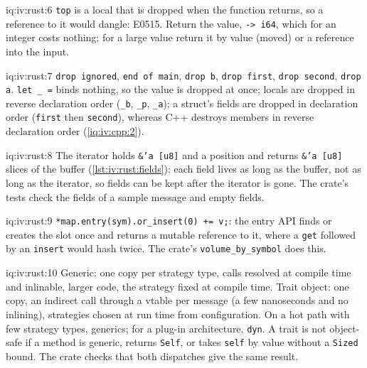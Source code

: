 \begin{solution}{iq:iv:rust:6}
\texttt{top} is a local that is dropped when the function returns, so a reference to it would dangle: E0515. Return the value,
\texttt{-> i64}, which for an integer costs nothing; for a large value return it by value (moved) or a reference into the input.
\end{solution}

\begin{solution}{iq:iv:rust:7}
\texttt{drop ignored}, \texttt{end of main}, \texttt{drop b}, \texttt{drop first}, \texttt{drop second}, \texttt{drop a}. \texttt{let \_ =}
binds nothing, so the value is dropped at once; locals are dropped in reverse declaration order (\texttt{\_b}, \texttt{\_p},
\texttt{\_a}); a struct's fields are dropped in declaration order (\texttt{first} then \texttt{second}), whereas C++ destroys members in
reverse declaration order (\cref{iq:iv:cpp:2}).
\end{solution}

\begin{solution}{iq:iv:rust:8}
The iterator holds \texttt{\&'a [u8]} and a position and returns \texttt{\&'a [u8]} slices of the buffer
(\cref{lst:iv:rust:fields}): each field lives as long as the buffer, not as long as the iterator, so fields can be kept after
the iterator is gone. The crate's tests check the fields of a sample message and empty fields.
\end{solution}

\begin{solution}{iq:iv:rust:9}
\texttt{*map.entry(sym).or\_insert(0) += v;}: the entry API finds or creates the slot once and returns a mutable reference to it, where a
\texttt{get} followed by an \texttt{insert} would hash twice. The crate's \texttt{volume\_by\_symbol} does this.
\end{solution}

\begin{solution}{iq:iv:rust:10}
Generic: one copy per strategy type, calls resolved at compile time and inlinable, larger code, the strategy fixed at compile
time. Trait object: one copy, an indirect call through a vtable per message (a few nanoseconds and no inlining), strategies
chosen at run time from configuration. On a hot path with few strategy types, generics; for a plug-in architecture,
\texttt{dyn}. A trait is not object-safe if a method is generic, returns \texttt{Self}, or takes \texttt{self} by value without a
\texttt{Sized} bound. The crate checks that both dispatches give the same result.
\end{solution}

